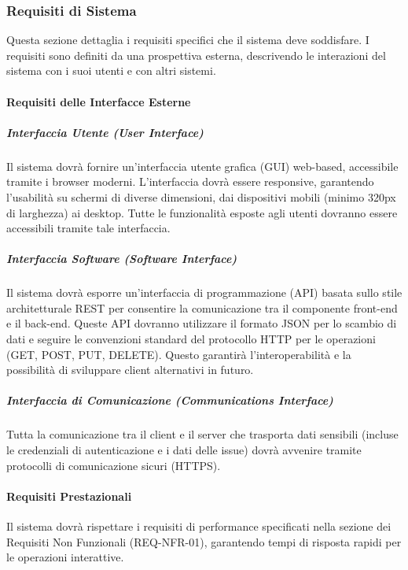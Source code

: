 \subsubsection{Requisiti di Sistema}
\label{subsec:requisiti-sistema}

Questa sezione dettaglia i requisiti specifici che il sistema \productname{} deve soddisfare. 
I requisiti sono definiti da una prospettiva esterna, descrivendo le interazioni del sistema con i suoi utenti e con altri sistemi.

\paragraph{Requisiti delle Interfacce Esterne}
\label{subsubsec:interfacce-esterne}

\subparagraph{Interfaccia Utente (User Interface)}
Il sistema dovrà fornire un'interfaccia utente grafica (GUI) web-based, accessibile tramite i browser moderni. 
L'interfaccia dovrà essere responsive, garantendo l'usabilità su schermi di diverse dimensioni, dai dispositivi mobili
(minimo 320px di larghezza) ai desktop. 
Tutte le funzionalità esposte agli utenti dovranno essere accessibili tramite tale interfaccia.

\subparagraph{Interfaccia Software (Software Interface)}
Il sistema dovrà esporre un'interfaccia di programmazione (API) basata sullo stile architetturale REST 
per consentire la comunicazione tra il componente front-end e il back-end. 
Queste API dovranno utilizzare il formato JSON per lo scambio di dati e seguire 
le convenzioni standard del protocollo HTTP per le operazioni (GET, POST, PUT, DELETE). 
Questo garantirà l'interoperabilità e la possibilità di sviluppare client alternativi in futuro.

\subparagraph{Interfaccia di Comunicazione (Communications Interface)}
Tutta la comunicazione tra il client e il server che trasporta dati sensibili 
(incluse le credenziali di autenticazione e i dati delle issue) 
dovrà avvenire tramite protocolli di comunicazione sicuri (HTTPS).

\paragraph{Requisiti Prestazionali}
\label{subsubsec:requisiti-prestazionali}
Il sistema dovrà rispettare i requisiti di performance specificati nella sezione dei 
Requisiti Non Funzionali (REQ-NFR-01), garantendo tempi di risposta rapidi per le operazioni interattive.

